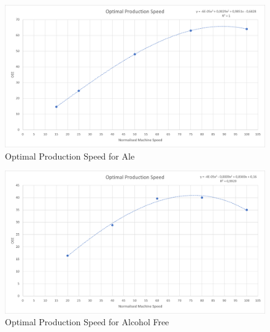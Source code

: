 \begin{figure}[H]
	\centering
	\includegraphics[width=1\linewidth]{images/ops/ale.png}
	\caption{Optimal Production Speed for Ale}
\end{figure}

\begin{figure}[H]
	\centering
	\includegraphics[width=1\linewidth]{images/ops/alcohol_free.png}
	\caption{Optimal Production Speed for Alcohol Free}
\end{figure}